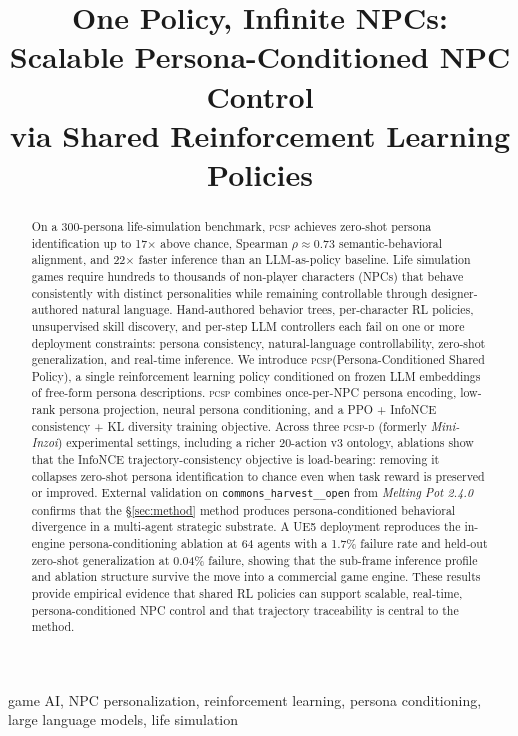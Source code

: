 \documentclass[conference]{IEEEtran}
\title{One Policy, Infinite NPCs:\\
Scalable Persona-Conditioned NPC Control\\
via Shared Reinforcement Learning Policies}
\author{%
  \IEEEauthorblockN{Yoosung Hong}
  \IEEEauthorblockA{Independent Researcher\\
    \url{https://github.com/yoosunghong/pcsp}}
}
\newcommand{\PCSP}{\textsc{pcsp}\xspace}
\newcommand{\PCSPD}{\textsc{pcsp-d}\xspace}
\begin{document}
\maketitle

\begin{abstract}
On a 300-persona life-simulation benchmark, \PCSP achieves zero-shot persona
identification up to 17$\times$ above chance, Spearman $\rho\!\approx\!0.73$
semantic-behavioral alignment, and 22$\times$ faster inference than an
LLM-as-policy baseline. Life simulation games require hundreds to thousands of
non-player characters (NPCs) that behave consistently with distinct personalities
while remaining controllable through designer-authored natural language.
Hand-authored behavior trees, per-character RL policies, unsupervised skill
discovery, and per-step LLM controllers each fail on one or more deployment
constraints: persona consistency, natural-language controllability, zero-shot
generalization, and real-time inference.
We introduce \PCSP (Persona-Conditioned Shared Policy), a single reinforcement
learning policy conditioned on frozen LLM embeddings of free-form persona
descriptions. \PCSP combines once-per-NPC persona encoding, low-rank persona
projection, neural persona conditioning, and a PPO + InfoNCE consistency + KL
diversity training objective. Across three \PCSPD{} (formerly \textit{Mini-Inzoi}) experimental settings,
including a richer 20-action v3 ontology, ablations show that the InfoNCE
trajectory-consistency objective is load-bearing: removing it collapses
zero-shot persona identification to chance even when task reward is preserved or
improved. External validation on \texttt{commons\_harvest\_\_open} from
\textit{Melting Pot 2.4.0}~\cite{leibo2021meltingpot} confirms that the
\S\ref{sec:method} method produces persona-conditioned behavioral divergence in
a multi-agent strategic substrate. A UE5
deployment reproduces the in-engine persona-conditioning ablation at 64 agents
with a 1.7\% failure rate and held-out zero-shot generalization at 0.04\%
failure, showing that the sub-frame inference profile and ablation structure
survive the move into a commercial game engine. These results provide empirical
evidence that shared RL policies can support scalable, real-time,
persona-conditioned NPC control and that trajectory traceability is central to
the method.
\end{abstract}

\begin{IEEEkeywords}
game AI, NPC personalization, reinforcement learning, persona conditioning,
large language models, life simulation
\end{IEEEkeywords}
\end{document}
